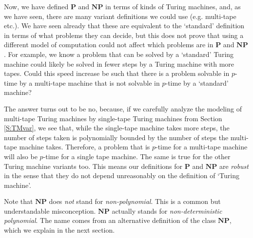 \documentclass{article}
\theoremstyle{plain}
\theoremstyle{definition}
\newcommand{\Po}{\mathbf{P}}
\newcommand{\NP}{\mathbf{NP}}
\begin{document}
Now, we have defined $\Po$ and $\NP$ in terms of kinds of Turing machines, and, as we have seen, there are many variant definitions we could use (e.g. multi-tape etc.). We have seen already that these are equivalent to the `standard' definition in terms of what problems they can decide, but this does not prove that using a different model of computation could not affect which problems are in $\Po$ and $\NP$. For example, we know a problem that can be solved by a `standard' Turing machine could likely be solved in fewer steps by a Turing machine with more tapes. Could this speed increase be such that there is a problem solvable in $p$-time by a multi-tape machine that is not solvable in $p$-time by a `standard' machine? 

The answer turns out to be no, because, if we carefully analyze the modeling of multi-tape Turing machines by single-tape Turing machines from Section \ref{S:TMvar}, we see that, while the single-tape machine takes more steps, the number of steps taken is polynomially bounded by the number of steps the multi-tape machine takes. Therefore, a problem that is $p$-time for a multi-tape machine will also be $p$-time for a single tape machine. The same is true for the other Turing machine variants too. This means our definitions for $\Po$ and $\NP$ are \emph{robust} in the sense that they do not depend unreasonably on the definition of `Turing machine'.     

Note that $\NP$ does \emph{not} stand for \emph{non-polynomial}. This is a common but understandable misconception. $\NP$ actually stands for \emph{non-deterministic polynomial}. The name comes from an alternative definition of the class $\NP$, which we explain in the next section.
\end{document}
